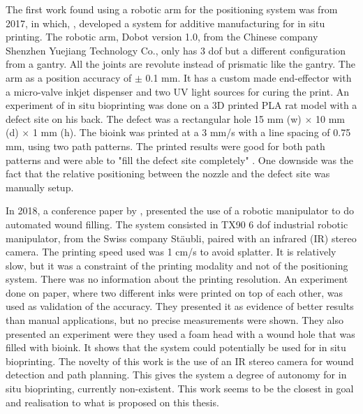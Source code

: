 The first work found using a robotic arm for the positioning system was from 2017, in which, \citeauthor{Li2017a_additive_manufacturing_in_situ_printing_dobot}\cite{Li2017a_additive_manufacturing_in_situ_printing_dobot}, developed a system for additive manufacturing for in situ printing. The robotic arm, Dobot version 1.0, from the Chinese company Shenzhen Yuejiang Technology Co., only has 3 \gls{dof} but a different configuration from a gantry. All the joints are revolute instead of prismatic like the gantry. The arm as a position accuracy of $\pm$ 0.1 mm. It has a custom made end-effector with a micro-valve inkjet dispenser and two UV light sources for curing the print. An experiment of in situ bioprinting was done on a 3D printed PLA rat model with a defect site on his back. The defect was a rectangular hole 15 mm (w) $\times$ 10  mm (d) $\times$ 1 mm (h). The bioink was printed at a 3 mm/s with a line spacing of 0.75 mm, using two path patterns. The printed results were good for both path patterns and were able to "fill the defect site completely" \cite{Li2017a_additive_manufacturing_in_situ_printing_dobot}. One downside was the fact that the relative positioning between the nozzle and the defect site was manually setup.

In 2018, a conference paper by \citeauthor{Jafari2018_robot_system_automated_wound_filling}\cite{Jafari2018_robot_system_automated_wound_filling}, presented the use of a robotic manipulator to do automated wound filling. The system consisted in TX90 6 \gls{dof} industrial robotic manipulator, from the Swiss company St\"{a}ubli, paired with an infrared (IR) stereo camera. The printing speed used was 1 cm/s to avoid splatter. It is relatively slow, but it was a constraint of the printing modality and not of the positioning system. There was no information about the printing resolution. An experiment done on paper, where two different inks were printed on top of each other, was used as validation of the accuracy. They presented it as evidence of better results than manual applications, but no precise measurements were shown. They also presented an experiment were they used a foam head with a wound hole that was filled with bioink. It shows that the system could potentially be used for in situ bioprinting. The novelty of this work is the use of an IR stereo camera for wound detection and path planning. This gives the system a degree of autonomy for in situ bioprinting, currently non-existent. This work seems to be the closest in goal and realisation to what is proposed on this thesis.

